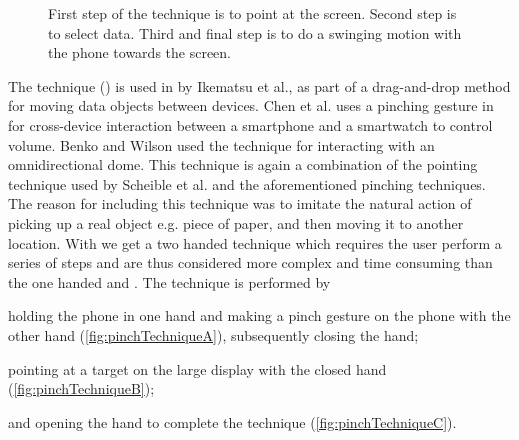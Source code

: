 \begin{figure}[H]
\caption{\protect{} First step of the \throw technique is to point at the screen. \protect{} Second step is to select data. \protect{} Third and final step is to do a swinging motion with the phone towards the screen.}
\label{fig:throwTechnique}
\end{figure}

The \pinch technique () is used in \cite{Ikematsu:2015} by Ikematsu et al., as part of a drag-and-drop method for moving data objects between devices.
Chen et al. uses a pinching gesture in \cite{Chen:2014} for cross-device interaction between a smartphone and a smartwatch to control volume. 
Benko and Wilson \cite{Benko:2010} used the \pinch technique for interacting with an omnidirectional dome.
This technique is again a combination of the pointing technique used by Scheible et al. \cite{Scheible:2008} and the aforementioned pinching techniques. 
The reason for including this technique was to imitate the natural action of picking up a real object e.g. piece of paper, and then moving it to another location.
With \pinch we get a two handed technique which requires the user perform a series of steps and are thus considered more complex and time consuming  than the one handed \swipe and \tilt.
The \pinch technique is performed by 
\begin{enumerate*}[label=\itshape\roman*\upshape)]
	\item{holding the phone in one hand and making a pinch gesture on the phone with the other hand (\cref{fig:pinchTechniqueA}), subsequently closing the hand;}
	\item{pointing at a target on the large display with the closed hand (\cref{fig:pinchTechniqueB});}
	\item{and opening the hand to complete the technique (\cref{fig:pinchTechniqueC}).}
\end{enumerate*}

